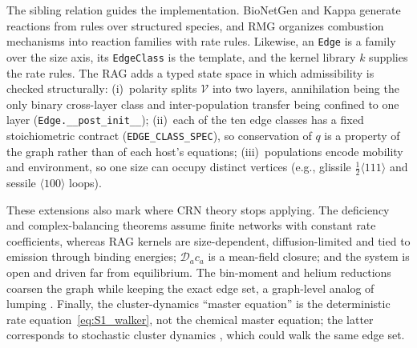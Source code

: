 The sibling relation guides the implementation. BioNetGen and Kappa
\cite{Faeder2009,DanosLaneve2004} generate reactions from rules over
structured species, and RMG \cite{Gao2016} organizes combustion mechanisms
into reaction families with rate rules. Likewise, an \texttt{Edge} is a
family over the size axis, its \texttt{EdgeClass} is the template, and the
kernel library $k$ supplies the rate rules. The RAG adds a typed state
space in which admissibility is checked structurally: (i)~polarity splits
$\mathcal{V}$ into two layers, annihilation being the only binary
cross-layer class and inter-population transfer being confined to one
layer (\texttt{Edge.\_\_post\_init\_\_}); (ii)~each of the ten edge
classes has a fixed stoichiometric contract (\texttt{EDGE\_CLASS\_SPEC}),
so conservation of $q$ is a property of the graph rather than of each
host's equations; (iii)~populations encode mobility and environment, so
one size can occupy distinct vertices (e.g., glissile
$\tfrac12\langle111\rangle$ and sessile $\langle100\rangle$ loops).

These extensions also mark where CRN theory stops applying. The
deficiency and complex-balancing theorems
\cite{HornJackson1972,Feinberg1987} assume finite networks with constant
rate coefficients, whereas RAG kernels are size-dependent,
diffusion-limited and tied to emission through binding energies;
$\mathcal{D}_a c_a$ is a mean-field closure; and the system is open and
driven far from equilibrium. The bin-moment and helium reductions coarsen
the graph while keeping the exact edge set, a graph-level analog of
lumping \cite{WeiKuo1969}. Finally, the cluster-dynamics ``master
equation'' is the deterministic rate equation~\eqref{eq:S1_walker}, not
the chemical master equation; the latter corresponds to stochastic
cluster dynamics \cite{Gillespie1976,MarianBulatov2011}, which could walk
the same edge set.

